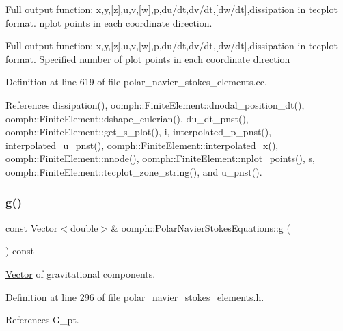 Full output function\+: x,y,\mbox{[}z\mbox{]},u,v,\mbox{[}w\mbox{]},p,du/dt,dv/dt,\mbox{[}dw/dt\mbox{]},dissipation in tecplot format. nplot points in each coordinate direction. 

Full output function\+: x,y,\mbox{[}z\mbox{]},u,v,\mbox{[}w\mbox{]},p,du/dt,dv/dt,\mbox{[}dw/dt\mbox{]},dissipation in tecplot format. Specified number of plot points in each coordinate direction 

Definition at line 619 of file polar\+\_\+navier\+\_\+stokes\+\_\+elements.\+cc.



References dissipation(), oomph\+::\+Finite\+Element\+::dnodal\+\_\+position\+\_\+dt(), oomph\+::\+Finite\+Element\+::dshape\+\_\+eulerian(), du\+\_\+dt\+\_\+pnst(), oomph\+::\+Finite\+Element\+::get\+\_\+s\+\_\+plot(), i, interpolated\+\_\+p\+\_\+pnst(), interpolated\+\_\+u\+\_\+pnst(), oomph\+::\+Finite\+Element\+::interpolated\+\_\+x(), oomph\+::\+Finite\+Element\+::nnode(), oomph\+::\+Finite\+Element\+::nplot\+\_\+points(), s, oomph\+::\+Finite\+Element\+::tecplot\+\_\+zone\+\_\+string(), and u\+\_\+pnst().

\mbox{\label{classoomph_1_1PolarNavierStokesEquations_a2cc16c167589971e1598cbfb8d35af25}} 
\subsubsection{\texorpdfstring{g()}{g()}}
{\footnotesize\ttfamily const \hyperlink{classoomph_1_1Vector}{Vector}$<$double$>$\& oomph\+::\+Polar\+Navier\+Stokes\+Equations\+::g (\begin{DoxyParamCaption}{ }\end{DoxyParamCaption}) const\hspace{0.3cm}{\ttfamily [inline]}}



\hyperlink{classoomph_1_1Vector}{Vector} of gravitational components. 



Definition at line 296 of file polar\+\_\+navier\+\_\+stokes\+\_\+elements.\+h.



References G\+\_\+pt.

\mbox{\label{classoomph_1_1PolarNavierStokesEquations_a30ecb966cddb692a2095ffc40aa7e184}} 
